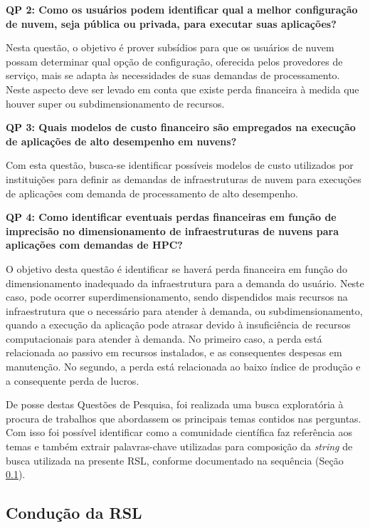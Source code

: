 \documentclass[tese,capa]{texufpel}
\begin{document}
\textbf{QP 2: Como os usuários podem identificar qual a melhor configuração de nuvem, seja pública ou privada, para executar suas aplicações?}

Nesta questão, o objetivo é prover subsídios para que os usuários de nuvem possam determinar qual opção de configuração, oferecida pelos provedores de serviço, mais se adapta às necessidades de suas demandas de processamento. Neste aspecto deve ser levado em conta que existe perda financeira à medida que houver super ou subdimensionamento de recursos.

\textbf{QP 3: Quais modelos de custo financeiro são empregados na execução de aplicações de alto desempenho em nuvens?}

Com esta questão, busca-se identificar possíveis modelos de custo utilizados por instituições para definir as demandas de  infraestruturas de nuvem para execuções de aplicações com demanda de processamento de alto desempenho.

\textbf{QP 4: Como identificar eventuais perdas financeiras em função de imprecisão no dimensionamento de infraestruturas de nuvens para aplicações com demandas de HPC?}

O objetivo desta questão é identificar se haverá perda financeira em função do dimensionamento inadequado da infraestrutura para a demanda do usuário. Neste caso, pode ocorrer superdimensionamento, sendo dispendidos mais recursos na infraestrutura que o necessário para atender à demanda, ou subdimensionamento, quando a execução da aplicação pode atrasar devido à insuficiência de recursos computacionais para atender à demanda. No primeiro caso, a perda está relacionada ao passivo em recursos instalados, e as consequentes despesas em manutenção. No segundo, a perda está relacionada ao baixo índice de produção e a consequente perda de lucros.

De posse destas Questões de Pesquisa, foi realizada uma busca exploratória à procura de trabalhos que abordassem os principais temas contidos nas perguntas. Com isso foi possível identificar como a comunidade científica faz referência aos temas e também extrair palavras-chave utilizadas para composição da \emph{string} de busca utilizada na presente RSL, conforme documentado na sequência (Seção \ref{sec:conducaoRSL}).

\subsection{Condução da RSL}\label{sec:conducaoRSL}
\end{document}
